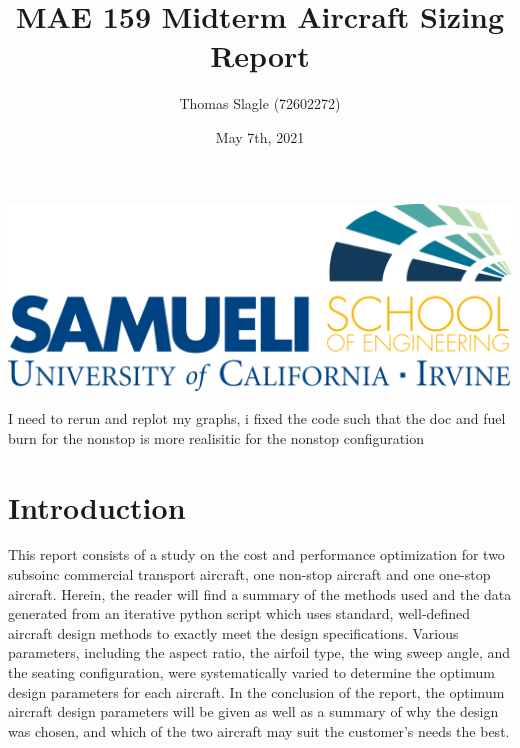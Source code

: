 \documentclass{article}
\title{MAE 159 Midterm Aircraft Sizing Report}
\author{Thomas Slagle (72602272)}
\date{May 7th, 2021}
\begin{document}
    \maketitle
    \begin{center}
        \includegraphics[scale=0.4]{pngjoy.com_uci-logo-uc-irvine-henry-samueli-school-of_6860660.png}
    \end{center}

    \pagebreak
    \tableofcontents
    \pagebreak

I need to rerun and replot my graphs, i fixed the code such that the doc and fuel burn for the nonstop is more realisitic for the nonstop configuration

    \section{Introduction}
    \label{sec:intro}
    \begin{flushleft}
        This report consists of a study on the cost and performance optimization
        for two subsoinc commercial transport aircraft, one non-stop aircraft
        and one one-stop aircraft. Herein, the reader will find a summary of the
        methods used and the data generated from an iterative python script
        which uses standard, well-defined aircraft design methods to exactly
        meet the design specifications. Various parameters, including the aspect
        ratio, the airfoil type, the wing sweep angle, and the seating
        configuration, were systematically varied to determine the optimum
        design parameters for each aircraft. In the conclusion of the report,
        the optimum aircraft design parameters will be given as well as a
        summary of why the design was chosen, and which of the two
        aircraft may suit the customer's needs the best.
    \end{flushleft}
\end{document}
